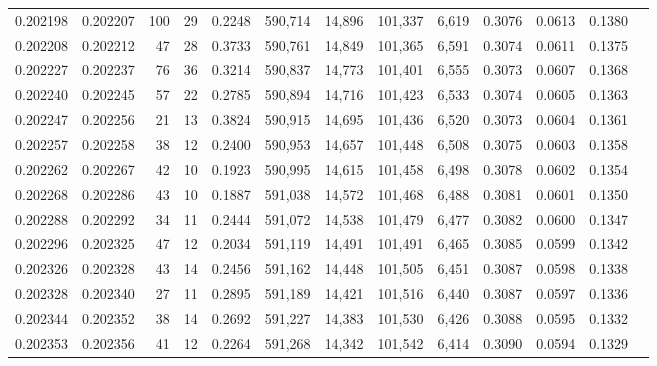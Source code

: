 \begin{tabular}{rrrrrrrrrrrrr}
0.202198 & 0.202207 &   100 &  29 &                                     0.2248 & 590,714 &  14,896 & 101,337 &   6,619 & 0.3076 & 0.0613 & 0.1380 \\
0.202208 & 0.202212 &    47 &  28 &                                     0.3733 & 590,761 &  14,849 & 101,365 &   6,591 & 0.3074 & 0.0611 & 0.1375 \\
0.202227 & 0.202237 &    76 &  36 &                                     0.3214 & 590,837 &  14,773 & 101,401 &   6,555 & 0.3073 & 0.0607 & 0.1368 \\
0.202240 & 0.202245 &    57 &  22 &                                     0.2785 & 590,894 &  14,716 & 101,423 &   6,533 & 0.3074 & 0.0605 & 0.1363 \\
0.202247 & 0.202256 &    21 &  13 &                                     0.3824 & 590,915 &  14,695 & 101,436 &   6,520 & 0.3073 & 0.0604 & 0.1361 \\
0.202257 & 0.202258 &    38 &  12 &                                     0.2400 & 590,953 &  14,657 & 101,448 &   6,508 & 0.3075 & 0.0603 & 0.1358 \\
0.202262 & 0.202267 &    42 &  10 &                                     0.1923 & 590,995 &  14,615 & 101,458 &   6,498 & 0.3078 & 0.0602 & 0.1354 \\
0.202268 & 0.202286 &    43 &  10 &                                     0.1887 & 591,038 &  14,572 & 101,468 &   6,488 & 0.3081 & 0.0601 & 0.1350 \\
0.202288 & 0.202292 &    34 &  11 &                                     0.2444 & 591,072 &  14,538 & 101,479 &   6,477 & 0.3082 & 0.0600 & 0.1347 \\
0.202296 & 0.202325 &    47 &  12 &                                     0.2034 & 591,119 &  14,491 & 101,491 &   6,465 & 0.3085 & 0.0599 & 0.1342 \\
0.202326 & 0.202328 &    43 &  14 &                                     0.2456 & 591,162 &  14,448 & 101,505 &   6,451 & 0.3087 & 0.0598 & 0.1338 \\
0.202328 & 0.202340 &    27 &  11 &                                     0.2895 & 591,189 &  14,421 & 101,516 &   6,440 & 0.3087 & 0.0597 & 0.1336 \\
0.202344 & 0.202352 &    38 &  14 &                                     0.2692 & 591,227 &  14,383 & 101,530 &   6,426 & 0.3088 & 0.0595 & 0.1332 \\
0.202353 & 0.202356 &    41 &  12 &                                     0.2264 & 591,268 &  14,342 & 101,542 &   6,414 & 0.3090 & 0.0594 & 0.1329 \\

\end{tabular}
